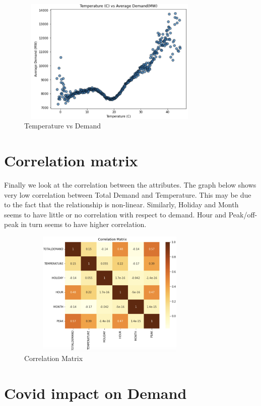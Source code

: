 \documentclass[mstat,12pt]{unswthesis}
\begin{document}
\begin{figure}[H]
\centering
\includegraphics[width=0.80\textwidth,height=6cm]{temperature_demand.png}
\caption{Temperature vs Demand}
\label{temperature_demand}
\end{figure}

\section{Correlation matrix}\label{correlation-matrix}

Finally we look at the correlation between the attributes. The graph
below shows very low correlation between Total Demand and Temperature.
This may be due to the fact that the relationship is non-linear.
Similarly, Holiday and Month seems to have little or no correlation with
respect to demand. Hour and Peak/off-peak in turn seems to have higher
correlation.

\begin{figure}[H]
\centering
\includegraphics[width=0.80\textwidth,height=6cm]{correlation_matrix.png}
\caption{Correlation Matrix}
\label{correlation_matrix}
\end{figure}

\section{Covid impact on Demand}\label{covid-impact-on-demand}
\end{document}
